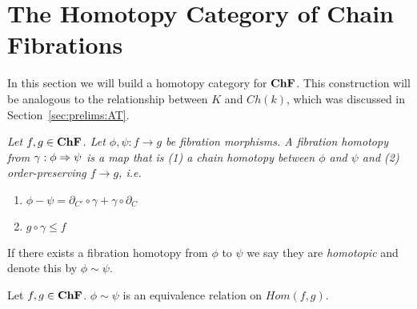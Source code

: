 
\section{The Homotopy Category of Chain Fibrations}\label{sec:homotopy}


  In this section we will build a homotopy category for ${\bf ChF}$.  This construction will be analogous to the relationship between $K$ and $Ch(k)$, which was discussed in Section~\ref{sec:prelims:AT}.

\begin{defn}
{\em
Let $f,g\in {\bf ChF}$.  Let $\phi,\psi:f\to g$ be fibration morphisms.  A {\em fibration homotopy} from $\gamma:\phi\Rightarrow \psi$ is a map that is (1) a chain homotopy between $\phi$ and $\psi$ and (2) order-preserving $f\to g$, i.e.
\begin{enumerate}
\item $\phi - \psi = \partial_{C'}\circ \gamma + \gamma\circ \partial_C$
\item $g\circ \gamma \leq f$
\end{enumerate}
}
\end{defn}



If there exists a fibration homotopy from $\phi$ to $\psi$ we say they are {\em homotopic} and denote this by $\phi\sim \psi$.  

\begin{prop}
 Let $f,g\in {\bf ChF}$.  $\phi \sim \psi$ is an equivalence relation on $Hom(f,g)$.
\end{prop}
%
%
%
%
%
%


